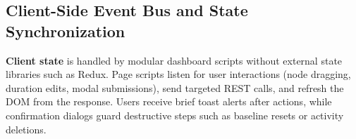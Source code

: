 \vspace{4mm}

\subsection{Client-Side Event Bus and State Synchronization}
\textbf{Client state} is handled by modular dashboard scripts without external state libraries such as Redux. Page scripts listen for user interactions (node dragging, duration edits, modal submissions), send targeted REST calls, and refresh the DOM from the response. Users receive brief toast alerts after actions, while confirmation dialogs guard destructive steps such as baseline resets or activity deletions.
